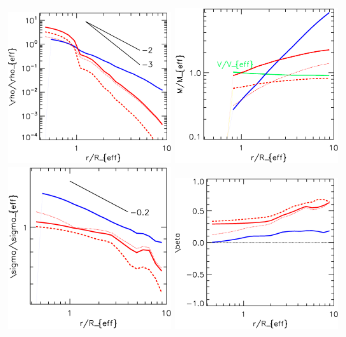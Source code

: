 \documentclass[a4paper,usenatbib,usegraphicx,twocolumn]{report}
\begin{document}
\pagestyle{empty}

\twocolumn
\begin{figure}
\centering \includegraphics[width=43mm]{rho3dstack.eps}
\centering \includegraphics[width=43mm]{m3dstack.eps}
\centering \includegraphics[width=43mm]{sigma3dstack.eps}
\centering \includegraphics[width=43mm]{beta3dstack.eps}
\end{figure}
\end{document}
